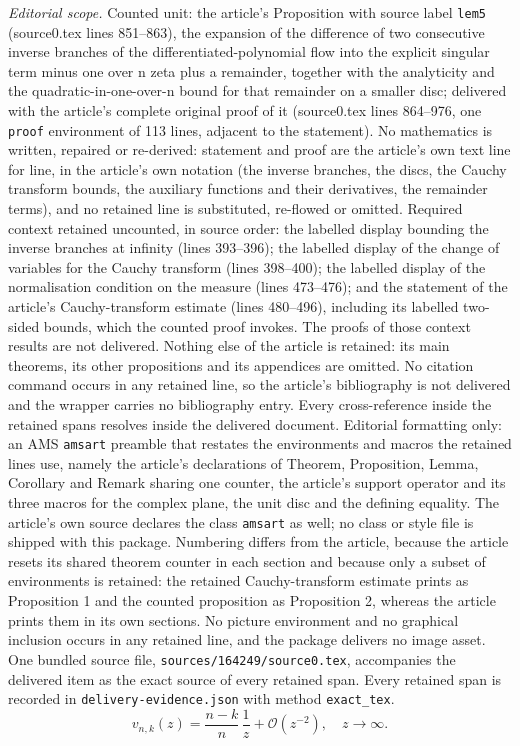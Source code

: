 \documentclass[10pt,a4paper]{amsart}
\theoremstyle{plain}
\theoremstyle{remark}
\begin{document}
\noindent\textit{Editorial scope.} Counted unit: the article's Proposition with source label \texttt{lem5} (source0.tex lines 851--863), the expansion of the difference of two consecutive inverse branches of the differentiated-polynomial flow into the explicit singular term minus one over n zeta plus a remainder, together with the analyticity and the quadratic-in-one-over-n bound for that remainder on a smaller disc; delivered with the article's complete original proof of it (source0.tex lines 864--976, one \texttt{proof} environment of 113 lines, adjacent to the statement). No mathematics is written, repaired or re-derived: statement and proof are the article's own text line for line, in the article's own notation (the inverse branches, the discs, the Cauchy transform bounds, the auxiliary functions and their derivatives, the remainder terms), and no retained line is substituted, re-flowed or omitted. Required context retained uncounted, in source order: the labelled display bounding the inverse branches at infinity (lines 393--396); the labelled display of the change of variables for the Cauchy transform (lines 398--400); the labelled display of the normalisation condition on the measure (lines 473--476); and the statement of the article's Cauchy-transform estimate (lines 480--496), including its labelled two-sided bounds, which the counted proof invokes. The proofs of those context results are not delivered. Nothing else of the article is retained: its main theorems, its other propositions and its appendices are omitted. No citation command occurs in any retained line, so the article's bibliography is not delivered and the wrapper carries no bibliography entry. Every cross-reference inside the retained spans resolves inside the delivered document. Editorial formatting only: an AMS \texttt{amsart} preamble that restates the environments and macros the retained lines use, namely the article's declarations of Theorem, Proposition, Lemma, Corollary and Remark sharing one counter, the article's support operator and its three macros for the complex plane, the unit disc and the defining equality. The article's own source declares the class \texttt{amsart} as well; no class or style file is shipped with this package. Numbering differs from the article, because the article resets its shared theorem counter in each section and because only a subset of environments is retained: the retained Cauchy-transform estimate prints as Proposition 1 and the counted proposition as Proposition 2, whereas the article prints them in its own sections. No picture environment and no graphical inclusion occurs in any retained line, and the package delivers no image asset. One bundled source file, \texttt{sources/164249/source0.tex}, accompanies the delivered item as the exact source of every retained span. Every retained span is recorded in \texttt{delivery-evidence.json} with method \texttt{exact\_tex}.
\begin{equation}
    \label{estimateatinftyvnk}
v_{n,k} (z) = \frac{n-k}{n  }\, \frac{1}{  z } + \mathcal O(z^{-2}), \quad z\to \infty.
\end{equation}
\end{document}
